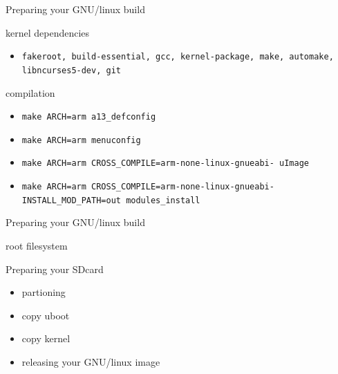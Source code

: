 \documentclass{beamer}
\begin{document}
 
 \begin{frame}{Preparing your GNU/linux build}
   \begin{block}{kernel dependencies}
     \begin{itemize}
     \item {\tt fakeroot, build-essential, gcc, kernel-package, make,
       automake, libncurses5-dev, git}
     \end{itemize} 
   \end{block}

   \begin{block}{compilation}
     \begin{itemize}
     \item {\tt make ARCH=arm a13\_defconfig}
     \item {\tt make ARCH=arm menuconfig}
     \item {\tt make ARCH=arm CROSS\_COMPILE=arm-none-linux-gnueabi-
       uImage}
     \item {\tt make ARCH=arm CROSS\_COMPILE=arm-none-linux-gnueabi-
       INSTALL\_MOD\_PATH=out modules\_install}
     \end{itemize} 
   \end{block}
 \end{frame}

 \begin{frame}{Preparing your GNU/linux build}
   \begin{block}{root filesystem}
   \end{block} 

   \begin{block}{Preparing your SDcard}
     \begin{itemize}
     \item partioning
     \item copy uboot
     \item copy kernel
     \item releasing your GNU/linux image
     \end{itemize}
   \end{block}
 \end{frame}
  
\end{document}
